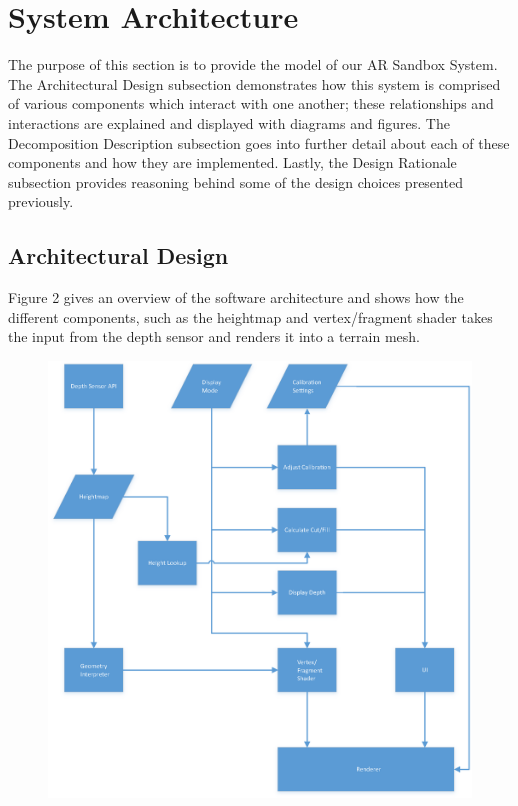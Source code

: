 \documentclass[onecolumn, draftclsnofoot,10pt, compsoc]{IEEEtran}
\begin{document}
\section{System Architecture}
The purpose of this section is to provide the model of our AR Sandbox System.  
The Architectural Design subsection demonstrates how this system is comprised of various components which interact with one another; these relationships and interactions are explained and displayed with diagrams and figures. 
The Decomposition Description subsection goes into further detail about each of these components and how they are implemented.
Lastly, the Design Rationale subsection provides reasoning behind some of the design choices presented previously.

\subsection{Architectural Design}
\par Figure 2 gives an overview of the software architecture and shows how the different components, such as the heightmap and vertex/fragment shader takes the input from the depth sensor and renders it into a terrain mesh.



\begin{figure}[H]
	\centering
	\includegraphics[width=6in]{SysArch}
    \label{fig:sysarchitecture}
\end{figure}
\end{document}
